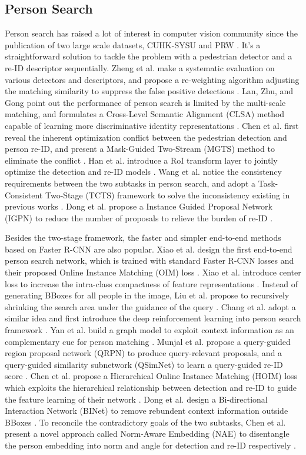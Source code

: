 \documentclass[letterpaper]{article} \usepackage{aaai21}  \usepackage{times}  \usepackage{helvet} \usepackage{courier}  \usepackage[hyphens]{url}  \usepackage{graphicx} \urlstyle{rm} \def\UrlFont{\rm}  \usepackage{natbib}  \usepackage{caption} \usepackage{multirow}
\begin{document}
\subsection{Person Search}
Person search has raised a lot of interest in computer vision community since the publication of two large scale datasets, CUHK-SYSU \cite{oim} and PRW \cite{prw}. It's a straightforward solution to tackle the problem with a pedestrian detector and a re-ID descriptor sequentially. Zheng et al. make a systematic evaluation on various detectors and descriptors, and propose a re-weighting algorithm adjusting the matching similarity to suppress the false positive detections \cite{prw}. Lan, Zhu, and Gong point out the performance of person search is limited by the multi-scale matching, and formulates a Cross-Level Semantic Alignment (CLSA) method capable of learning more discriminative identity representations \cite{clsa}. Chen et al. first reveal the inherent optimization conflict between the pedestrian detection and person re-ID, and present a Mask-Guided Two-Stream (MGTS) method to eliminate the conflict \cite{mgts}. Han et al. introduce a RoI transform layer to jointly optimize the detection and re-ID models \cite{reid-driven}. Wang et al. notice the consistency requirements between the two subtasks in person search, and adopt a Task-Consistent Two-Stage (TCTS) framework to solve the inconsistency existing in previous works \cite{tcts}. Dong et al. propose a Instance Guided Proposal Network (IGPN) to reduce the number of proposals to relieve the burden of re-ID \cite{igpn}.

Besides the two-stage framework, the faster and simpler end-to-end methods based on Faster R-CNN are also popular. Xiao et al. design the first end-to-end person search network, which is trained with standard Faster R-CNN losses and their proposed Online Instance Matching (OIM) loss \cite{oim}. Xiao et al. introduce center loss to increase the intra-class compactness of feature representations \cite{ian}. Instead of generating BBoxes for all people in the image, Liu et al. propose to recursively shrinking the search area under the guidance of the query \cite{npsm}. Chang et al. adopt a similar idea and first introduce the deep reinforcement learning into person search framework \cite{rcaa}. Yan et al. build a graph model to exploit context information as an complementary cue for person matching \cite{context}. Munjal et al. propose a query-guided region proposal network (QRPN) to produce query-relevant proposals, and a query-guided similarity subnetwork (QSimNet) to learn a query-guided re-ID score \cite{qeeps}. Chen et al. propose a Hierarchical Online Instance Matching (HOIM) loss which exploits the hierarchical relationship between detection and re-ID to guide the feature learning of their network \cite{hoim}. Dong et al. design a Bi-directional Interaction Network (BINet) to remove rebundent context information outside BBoxes \cite{binet}. To reconcile the contradictory goals of the two subtasks, Chen et al. present a novel approach called Norm-Aware Embedding (NAE) to disentangle the person embedding into norm and angle for detection and re-ID respectively \cite{nae}.
\end{document}
